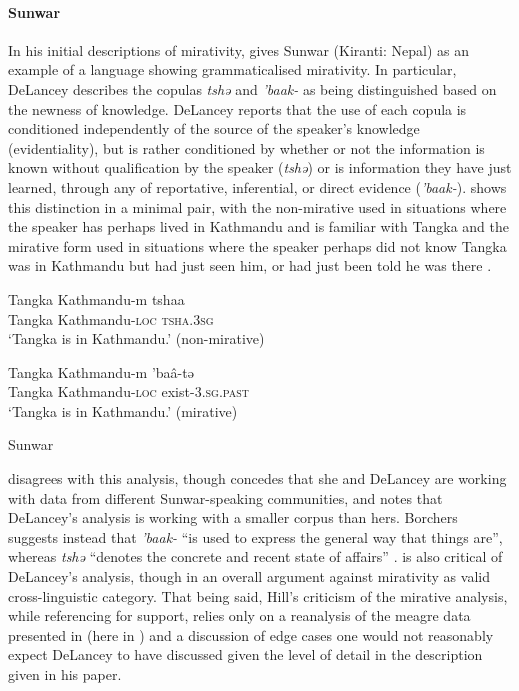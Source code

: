 \paragraph{Sunwar}
In his initial descriptions of mirativity,  gives Sunwar (Kiranti: Nepal) as an example of a language showing grammaticalised mirativity. In particular, DeLancey describes the copulas \textit{tshə} and \textit{'baak-} as being distinguished based on the newness of knowledge. DeLancey reports that the use of each copula is conditioned independently of the source of the speaker's knowledge (evidentiality), but is rather conditioned by whether or not the information is known without qualification by the speaker (\textit{tshə}) or is information they have just learned, through any of reportative, inferential, or direct evidence (\textit{'baak-}).  shows this distinction in a minimal pair, with the non-mirative used in situations where the speaker has perhaps lived in Kathmandu and is familiar with Tangka and the mirative form used in situations where the speaker perhaps did not know Tangka was in Kathmandu but had just seen him, or had just been told he was there \cite[42]{DeLanceyMirativity1997}.

\begin{exe}
        \ex\label{e:Description:SunwarMirative}
        \begin{xlist}
                \ex 
                \gll Tangka Kathmandu-m tshaa \\
                Tangka Kathmandu-\textsc{loc} \textsc{tsha.3sg} \\
                \glt `Tangka is in Kathmandu.' (non-mirative)

                \ex
                \gll Tangka Kathmandu-m 'baâ-tə \\
                Tangka Kathmandu-\textsc{loc} exist-\textsc{3.sg.past} \\
                \glt `Tangka is in Kathmandu.' (mirative)
        \end{xlist}
        Sunwar \cite[Kiranti: Nepal,][41-42]{DeLanceyMirativity1997}
\end{exe}

 disagrees with this analysis, though concedes that she and DeLancey are working with data from different Sunwar-speaking communities, and notes that DeLancey's analysis is working with a smaller corpus than hers. Borchers suggests instead that \textit{'baak-} ``is used to express the general way that things are'', whereas \textit{tshə} ``denotes the concrete and recent state of affairs'' \cite[164]{Borchers2008}.  is also critical of DeLancey's analysis, though in an overall argument against mirativity as valid cross-linguistic category. That being said, Hill's criticism of the mirative analysis, while referencing  for support, relies only on a reanalysis of the meagre data presented in  (here in ) and a discussion of edge cases one would not reasonably expect DeLancey to have discussed given the level of detail in the description given in his paper.

